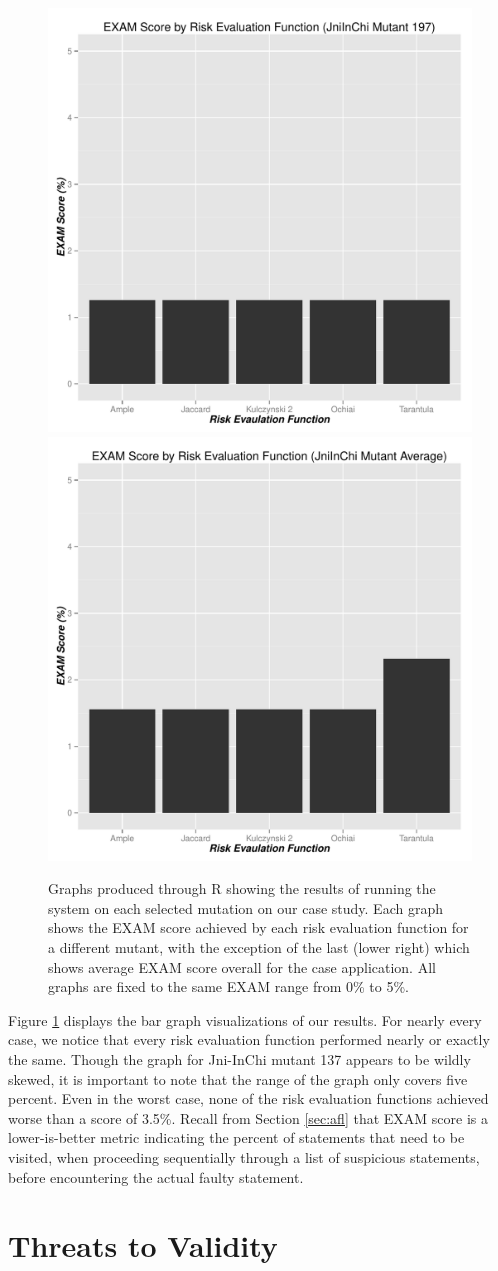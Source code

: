 \begin{figure}[tb]
\includegraphics[width=0.4\linewidth]{img/graph_197.pdf}
\hspace{0.1\linewidth}
\includegraphics[width=0.4\linewidth]{img/graph_avg.pdf}

\caption{Graphs produced through R showing the results of running
the system on each selected mutation on our case study.  Each graph
shows the EXAM score achieved by each risk evaluation function for a
different mutant, with the exception of the last (lower right) which
shows average EXAM score overall for the case application.  All graphs
are fixed to the same EXAM range from 0\% to 5\%.}
\label{fig:results}
\end{figure}

Figure \ref{fig:results} displays the bar graph visualizations of our results.  For nearly every case, 
we notice that every risk evaluation function performed nearly or exactly the same.  Though the 
graph for Jni-InChi mutant 137 appears to be wildly skewed, it is important to note that the range of the
graph only covers five percent.  Even in the worst case, none of the risk evaluation functions achieved
worse than a score of 3.5\%.  Recall from Section \ref{sec:afl} that EXAM score is a lower-is-better metric
indicating the percent of statements that need to be visited, when proceeding sequentially through a 
list of suspicious statements, before encountering the actual faulty statement.


\section{Threats to Validity}\label{sec:valid}

